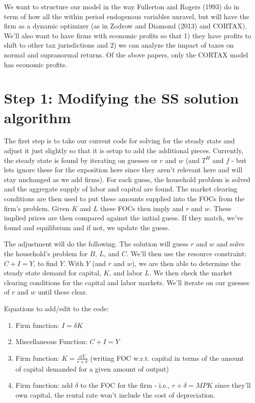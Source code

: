\documentclass[letterpaper,12pt]{article}
\theoremstyle{definition}
\begin{document}
We want to structure our model in the way Fullerton and Rogers (1993) do in term of how all the within period endogenous variables unravel, but will have the firm as a dynamic optimizer (as in Zodrow and Diamond (2013) and CORTAX).  We'll also want to have firms with economic profits so that 1) they have profits to shift to other tax jurisdictions and 2) we can analyze the impact of taxes on normal and supranormal returns.  Of the above papers, only the CORTAX model has economic profits.  

\section*{Step 1: Modifying the SS solution algorithm}

The first step is to take our current code for solving for the steady state and adjust it just slightly so that it is setup to add the additional pieces.  Currently, the steady state is found by iterating on guesses or $r$ and $w$ (and $T^{H}$ and $f$ - but lets ignore these for the exposition here since they aren't relevant here and will stay unchanged as we add firms).  For each guess, the household problem is solved and the aggregate supply of labor and capital are found.  The market clearing conditions are then used to put these amounts supplied into the FOCs from the firm's problem.  Given $K$ and $L$ these FOCs then imply and $r$ and $w$.  These implied prices are then compared against the initial guess. If they match, we've found and equilibrium and if not, we update the guess.

The adjustment will do the following.  The solution will guess $r$ and $w$ and solve the household's problem for $B$, $L$, and $C$.  We'll then use the resource constraint: $C+I=Y$, to find $Y$.  With $Y$ (and $r$ and $w$), we are then able to determine the steady state demand for capital, $K$, and labor $L$.  We then check the market clearing conditions for the capital and labor markets.  We'll iterate on our guesses of $r$ and $w$ until these clear.

Equations to add/edit to the code:
\begin{enumerate}
\item Firm function: $I = \delta K$
\item Miscellaneous Function: $C + I = Y$
\item Firm function: $K = \frac{\alpha Y}{r+\delta}$ (writing FOC w.r.t. capital in terms of the amount of capital demanded for a given amount of output)
\item Firm function: add $\delta$ to the FOC for the firm - i.e., $r+\delta = MPK$ since they'll own capital, the rental rate won't include the cost of depreciation.
\end{enumerate}
\end{document}
